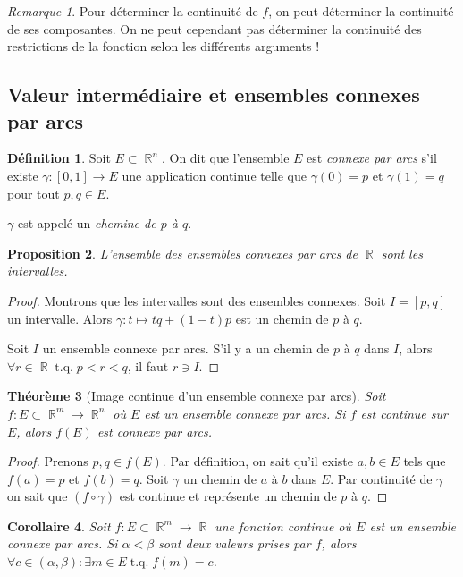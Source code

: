 \documentclass{article}
\DeclareMathOperator{\R}{\mathbb R}
\DeclareMathOperator{\tq}{ t.q. }
\newtheorem{thm}{Théorème}[section]
\newtheorem{prp}[thm]{Proposition}
\newtheorem{cor}[thm]{Corollaire}
\theoremstyle{definition}
\newtheorem{déf}[thm]{Définition}
\theoremstyle{remark}
\newtheorem*{rmq}{Remarque}
\begin{document}
		\begin{rmq} Pour déterminer la continuité de $f$, on peut déterminer la continuité de ses composantes. On ne peut cependant pas déterminer la continuité
		des restrictions de la fonction selon les différents arguments !
		\end{rmq}

	\subsection{Valeur intermédiaire et ensembles connexes par arcs}
		\begin{déf} Soit $E \subset \R^n$. On dit que l'ensemble $E$ est \emph{connexe par arcs} s'il existe $\gamma : [0, 1] \to E$ une application continue
		telle que $\gamma(0) = p$ et $\gamma(1) = q$ pour tout $p, q \in E$.

		$\gamma$ est appelé un \emph{chemine de $p$ à $q$}.
		\end{déf}

		\begin{prp} L'ensemble des ensembles connexes par arcs de $\R$ sont les intervalles. \end{prp}

		\begin{proof} Montrons que les intervalles sont des ensembles connexes. Soit $I = [p, q]$ un intervalle. Alors $\gamma : t \mapsto tq + (1-t)p$ est
		un chemin de $p$ à $q$.

		Soit $I$ un ensemble connexe par arcs. S'il y a un chemin de $p$ à $q$ dans $I$, alors $\forall r \in \R \tq p < r < q$, il faut $r \ni I$.
		\end{proof}

		\begin{thm}[Image continue d'un ensemble connexe par arcs]\label{thm:imageconnexepararcs} Soit $f : E \subset \R^m \to \R^n$ où $E$ est un ensemble
		connexe par arcs. Si $f$ est continue sur $E$, alors $f(E)$ est connexe par arcs.
		\end{thm}

		\begin{proof} Prenons $p, q \in f(E)$. Par définition, on sait qu'il existe $a, b \in E$ tels que $f(a) = p$ et $f(b) = q$. Soit $\gamma$ un chemin
		de $a$ à $b$ dans $E$. Par continuité de $\gamma$ on sait que $(f \circ \gamma)$ est continue et représente un chemin de $p$ à $q$.
		\end{proof}

		\begin{cor} Soit $f : E \subset \R^m \to \R$ une fonction continue où $E$ est un ensemble connexe par arcs. Si $\alpha < \beta$ sont deux valeurs
		prises par $f$, alors $\forall c \in (\alpha, \beta) : \exists m \in E \tq f(m) = c$.
		\end{cor}
\end{document}
